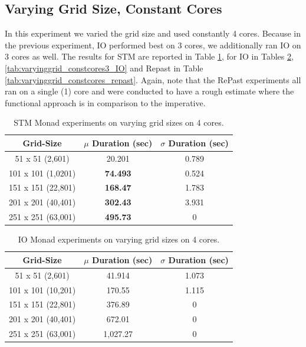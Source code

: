 \subsection{Varying Grid Size, Constant Cores}
In this experiment we varied the grid size and used constantly 4 cores. Because in the previous experiment, IO performed best on 3 cores, we additionally ran IO on 3 cores as well. The results for STM are reported in Table \ref{tab:varyinggrid_constcores_stm}, for IO in Tables \ref{tab:varyinggrid_constcores4_IO}, \ref{tab:varyinggrid_constcores3_IO} and Repast in Table \ref{tab:varyinggrid_constcores_repast}. Again, note that the RePast experiments all ran on a single (1) core and were conducted to have a rough estimate where the functional approach is in comparison to the imperative.

\begin{table}
	\centering
  	\begin{tabular}{ c || c | c }
        Grid-Size          & $\mu$ Duration (sec) & $\sigma$ Duration (sec) \\ \hline \hline 
   		51 x 51 (2,601)    & 20.201               & 0.789 \\ \hline
   		101 x 101 (1,0201) & \textbf{74.493}      & 0.524 \\ \hline
   		151 x 151 (22,801) & \textbf{168.47}      & 1.783 \\ \hline
   		201 x 201 (40,401) & \textbf{302.43}      & 3.931 \\ \hline 
   		251 x 251 (63,001) & \textbf{495.73}      & 0 \\ \hline
  	\end{tabular}

  	\caption{STM Monad experiments on varying grid sizes on 4 cores.}
	\label{tab:varyinggrid_constcores_stm}
\end{table}


\begin{table}
	\centering
  	\begin{tabular}{ c || c | c }
        Grid-Size          & $\mu$ Duration (sec) & $\sigma$ Duration (sec) \\ \hline \hline 
   		51 x 51 (2,601)    & 41.914 			 & 1.073 \\ \hline
   		101 x 101 (10,201) & 170.55 			 & 1.115 \\ \hline
   		151 x 151 (22,801) & 376.89 			 & 0 \\ \hline
   		201 x 201 (40,401) & 672.01 			 & 0 \\ \hline 
   		251 x 251 (63,001) & 1,027.27			 & 0 \\ \hline 
  	\end{tabular}
  	
  	\caption{IO Monad experiments on varying grid sizes on 4 cores.}
	\label{tab:varyinggrid_constcores4_IO}
\end{table}

